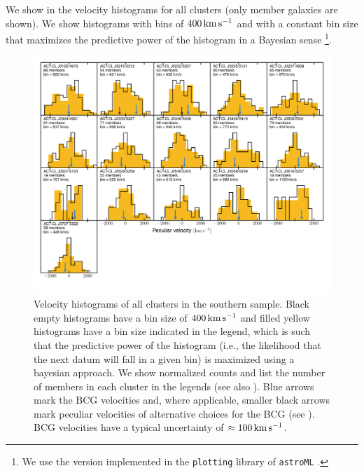 We show in  the velocity histograms for all clusters (only member 
galaxies are shown). We show histograms with bins of $400\,\mathrm{km\,s^{-1}}$ and with a 
constant bin size that maximizes the predictive power of the histogram in a Bayesian sense 
\citep{knuth06}\footnote{We use the version implemented in the \texttt{plotting} library of 
\texttt{astroML} \citep{vanderplas12}.}.

\begin{figure}
\centerline{\includegraphics[width=5in]{chapter3/histograms_all_south.pdf}}
\caption{Velocity histograms of all clusters in the southern sample. Black empty 
histograms have a bin size of $400\,\mathrm{km\,s^{-1}}$ and filled yellow histograms have a bin 
size indicated in the legend, which is such that the predictive power of the histogram (i.e., the 
likelihood that the next datum will fall in a given bin) is maximized using a bayesian approach. 
We show normalized counts and list the number of members in each cluster in the legends (see also 
). Blue arrows mark the BCG velocities and, where applicable, smaller black arrows mark peculiar velocities of alternative choices for the BCG (see ). BCG velocities have a typical uncertainty of $\approx100\,\mathrm{km\,s^{-1}}$.}
\label{f:hist_south}
\end{figure}

